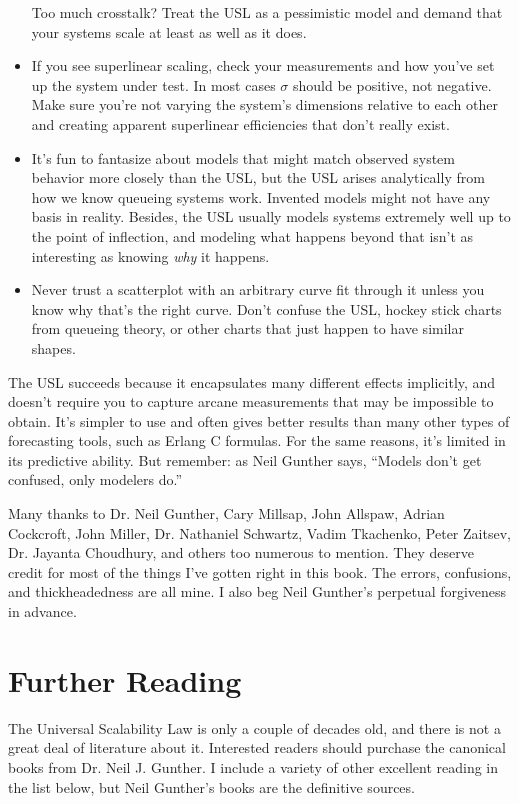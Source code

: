 \documentclass{vivid_layout}
\begin{document}
\begin{itemize}
Too much crosstalk? Treat the USL as a pessimistic model and demand that your
systems scale at least as well as it does.
\item If you see superlinear scaling, check your measurements and how you've set
up the system under test. In most cases $\sigma$ should be positive, not
negative. Make sure you're not varying the system's dimensions relative to each
other and creating apparent superlinear efficiencies that don't really exist.
\item It's fun to fantasize about models that might match observed system
behavior more closely than the USL, but the USL arises analytically from how we
know queueing systems work. Invented models might not have any basis in reality.
Besides, the USL usually models systems extremely well up to the point of
inflection, and modeling what happens beyond that isn't as interesting as
knowing {\itshape why} it happens.
\item Never trust a scatterplot with an arbitrary curve fit through it unless
you know why that's the right curve. Don't confuse the USL, hockey stick charts
from queueing theory, or other charts that just happen to have similar shapes.
\end{itemize}

The USL succeeds because it encapsulates many different effects implicitly, and
doesn't require you to capture arcane measurements that may be impossible to
obtain. It's simpler to use and often gives better results than many other types of
forecasting tools, such as Erlang C formulas. For the same reasons, it's limited
in its predictive ability. But remember: as Neil Gunther says, ``Models don't
get confused, only modelers do.''

Many thanks to Dr. Neil Gunther, Cary Millsap, John Allspaw, Adrian Cockcroft,
John Miller, Dr.  Nathaniel Schwartz, Vadim Tkachenko, Peter Zaitsev, Dr.
Jayanta Choudhury, and others too numerous to mention. They deserve credit for
most of the things I've gotten right in this book. The errors, confusions, and
thickheadedness are all mine. I also beg Neil Gunther's perpetual forgiveness in
advance.

\section{Further Reading}

The Universal Scalability Law is only a couple of decades old, and there is not a
great deal of literature about it. Interested readers should purchase the
canonical books from Dr. Neil J. Gunther. I include a variety of other excellent
reading in the list below, but Neil Gunther's books are the definitive sources.
\end{document}
